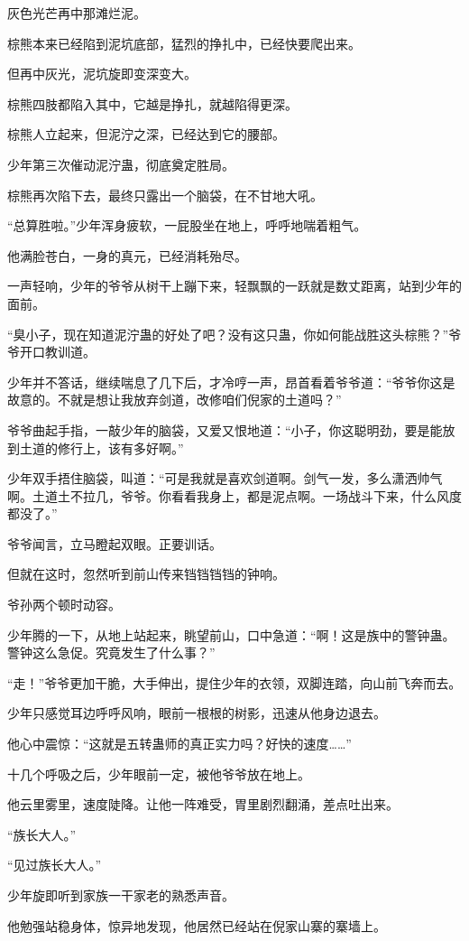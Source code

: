 \begin{this_body}
灰色光芒再中那滩烂泥。

棕熊本来已经陷到泥坑底部，猛烈的挣扎中，已经快要爬出来。

但再中灰光，泥坑旋即变深变大。

棕熊四肢都陷入其中，它越是挣扎，就越陷得更深。

棕熊人立起来，但泥泞之深，已经达到它的腰部。

少年第三次催动泥泞蛊，彻底奠定胜局。

棕熊再次陷下去，最终只露出一个脑袋，在不甘地大吼。

“总算胜啦。”少年浑身疲软，一屁股坐在地上，呼呼地喘着粗气。

他满脸苍白，一身的真元，已经消耗殆尽。

一声轻响，少年的爷爷从树干上蹦下来，轻飘飘的一跃就是数丈距离，站到少年的面前。

“臭小子，现在知道泥泞蛊的好处了吧？没有这只蛊，你如何能战胜这头棕熊？”爷爷开口教训道。

少年并不答话，继续喘息了几下后，才冷哼一声，昂首看着爷爷道：“爷爷你这是故意的。不就是想让我放弃剑道，改修咱们倪家的土道吗？”

爷爷曲起手指，一敲少年的脑袋，又爱又恨地道：“小子，你这聪明劲，要是能放到土道的修行上，该有多好啊。”

少年双手捂住脑袋，叫道：“可是我就是喜欢剑道啊。剑气一发，多么潇洒帅气啊。土道土不拉几，爷爷。你看看我身上，都是泥点啊。一场战斗下来，什么风度都没了。”

爷爷闻言，立马瞪起双眼。正要训话。

但就在这时，忽然听到前山传来铛铛铛铛的钟响。

爷孙两个顿时动容。

少年腾的一下，从地上站起来，眺望前山，口中急道：“啊！这是族中的警钟蛊。警钟这么急促。究竟发生了什么事？”

“走！”爷爷更加干脆，大手伸出，提住少年的衣领，双脚连踏，向山前飞奔而去。

少年只感觉耳边呼呼风响，眼前一根根的树影，迅速从他身边退去。

他心中震惊：“这就是五转蛊师的真正实力吗？好快的速度……”

十几个呼吸之后，少年眼前一定，被他爷爷放在地上。

他云里雾里，速度陡降。让他一阵难受，胃里剧烈翻涌，差点吐出来。

“族长大人。”

“见过族长大人。”

少年旋即听到家族一干家老的熟悉声音。

他勉强站稳身体，惊异地发现，他居然已经站在倪家山寨的寨墙上。


\end{this_body}
